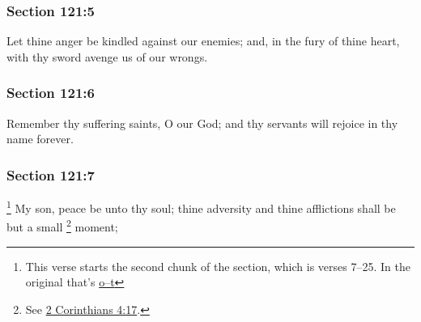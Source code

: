 	\subsubsection{Section 121:5} %
		\label{DC121-5}

		Let thine anger be kindled against our enemies; and, in the fury of thine heart, with thy sword avenge us of our wrongs.


	\subsubsection{Section 121:6} %
		\label{DC121-6}

		Remember thy suffering saints, O our God; and thy servants will rejoice in thy name forever.


	\subsubsection{Section 121:7} %
		\label{DC121-7}

			\footnote{%
				This verse starts the second chunk of the section, which is verses 7--25. In the original that's \hyperlink{EMS-1839-JS-20-MAR-1839-o}{o--t}
				}%
		My son, peace be unto thy soul; thine adversity and thine afflictions shall be but a small
			\footnote{%
				See \hyperref[2CORINTHIANS-4-17]{2 Corinthians 4:17}.
				}%
		moment;


